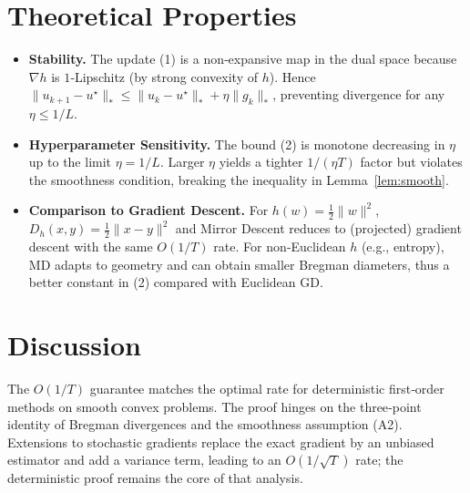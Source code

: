 \documentclass{article}
\newcommand{\Breg}[2]{D_{h}(#1,#2)}
\newcommand{\grad}{\nabla}
\begin{document}
\vspace{1em}
\section*{Theoretical Properties}
\begin{itemize}
\item \textbf{Stability.} The update (1) is a non‑expansive map in the dual space
because $\grad h$ is $1$‑Lipschitz (by strong convexity of $h$). Hence
$\|u_{k+1}-u^{\star}\|_{*}\le\|u_k-u^{\star}\|_{*}+ \eta\|g_k\|_{*}$,
preventing divergence for any $\eta\le1/L$.
\item \textbf{Hyperparameter Sensitivity.} The bound (2) is monotone decreasing
in $\eta$ up to the limit $\eta=1/L$. Larger $\eta$ yields a tighter
$1/(\eta T)$ factor but violates the smoothness condition, breaking the
inequality in Lemma~\ref{lem:smooth}.
\item \textbf{Comparison to Gradient Descent.} For $h(w)=\frac12\|w\|^{2}$,
$\Breg{x}{y}=\frac12\|x-y\|^{2}$ and Mirror Descent reduces to (projected) gradient
descent with the same $O(1/T)$ rate. For non‑Euclidean $h$ (e.g., entropy),
MD adapts to geometry and can obtain smaller Bregman diameters,
thus a better constant in (2) compared with Euclidean GD.
\end{itemize}

\vspace{1em}
\section*{Discussion}
The $O(1/T)$ guarantee matches the optimal rate for deterministic first‑order
methods on smooth convex problems. The proof hinges on the three‑point
identity of Bregman divergences and the smoothness assumption (A2). Extensions
to stochastic gradients replace the exact gradient by an unbiased estimator and
add a variance term, leading to an $O(1/\sqrt{T})$ rate; the deterministic proof
remains the core of that analysis.

\vspace{1em}
\end{document}
